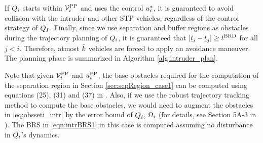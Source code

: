 If $Q_i$ starts within $\mathcal{V}^{\text{PP}}_{i}$ and uses the control ${u^*_{i}}$, it is guaranteed to avoid collision with the intruder and other STP vehicles, regardless of the control strategy of $Q_{I}$. Finally, since we use separation and buffer regions as obstacles during the trajectory planning of $Q_i$, it is guaranteed that $|\underline{t}_i - \underline{t}_j| \geq t^\text{BRD}$ for all $j < i$. Therefore, atmost $\bar{k}$ vehicles are forced to apply an avoidance maneuver. The planning phase is summarized in Algorithm \ref{alg:intruder_plan}.
\begin{remark}
Note that given $\mathcal{V}^{\text{PP}}_{i}$ and ${u^{\text{PP}}_{i}}$, the base obstacles required for the computation of the separation region in Section \ref{sec:sepRegion_case1} can be computed using equations (25), (31) and (37) in \cite{Chen2016d}. Also, if we use the robust trajectory tracking method to compute the base obstacles, we would need to augment the obstacles in \eqref{eq:obsseti_intr} by the error bound of $Q_i$, $\Omega_i$ (for details, see Section 5A-3 in \cite{Chen2016d}). The BRS in \eqref{eqn:intrBRS1} in this case is computed assuming no disturbance in $Q_i$'s dynamics.
\end{remark}
%
